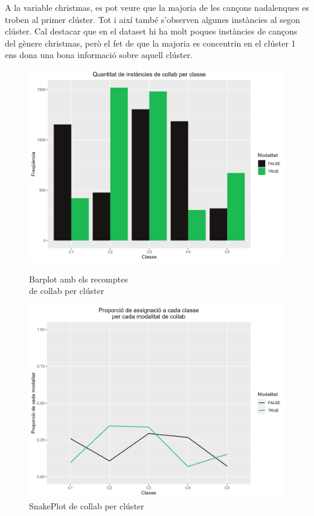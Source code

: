A la variable christmas, es pot veure que la majoria de les cançons nadalenques es troben al primer clúster. Tot i així també s'observen algunes instàncies al segon clúster. Cal destacar que en el dataset hi ha molt poques instàncies de cançons del gènere christmas, però el fet de que la majoria es concentrin en el clúster 1 ens dona una bona informació sobre aquell clúster. 


\begin{figure}[H]
\centering
    \begin{minipage}{.49\textwidth}
        \centering
        \includegraphics[width=0.95\linewidth]{Images/5_Profiling/categoriques/cat/Cat_BarPlot_collab.png}
        \caption{Barplot amb els recomptes \\ de collab per clúster}
        \label{fig:Cat_BarPlot_collab}
    \end{minipage}%
    \begin{minipage}{.49\textwidth}
        \centering
        \includegraphics[width=0.95\linewidth]{Images/5_Profiling/categoriques/cat/Cat_SnakePlot_collab.png}
        \caption{SnakePlot de collab per clúster}
        \label{fig:Cat_SnakePlot_collab}
    \end{minipage}%
\end{figure}


